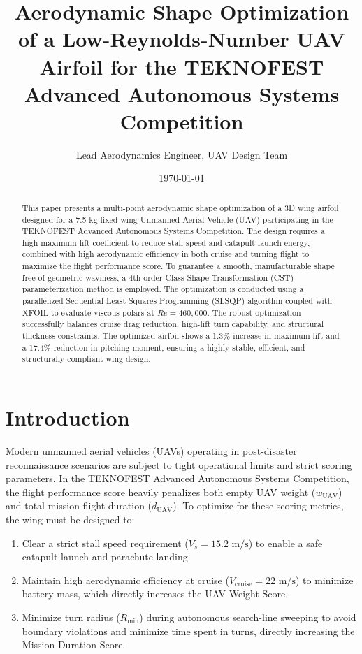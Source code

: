 \documentclass[11pt]{article}
\begin{document}
\title{\textbf{Aerodynamic Shape Optimization of a Low-Reynolds-Number UAV Airfoil for the TEKNOFEST Advanced Autonomous Systems Competition}}

\author{Lead Aerodynamics Engineer, UAV Design Team}
\date{\today}

\maketitle

\begin{abstract}
This paper presents a multi-point aerodynamic shape optimization of a 3D wing airfoil designed for a 7.5 kg fixed-wing Unmanned Aerial Vehicle (UAV) participating in the TEKNOFEST Advanced Autonomous Systems Competition. The design requires a high maximum lift coefficient to reduce stall speed and catapult launch energy, combined with high aerodynamic efficiency in both cruise and turning flight to maximize the flight performance score. To guarantee a smooth, manufacturable shape free of geometric waviness, a 4th-order Class Shape Transformation (CST) parameterization method is employed. The optimization is conducted using a parallelized Sequential Least Squares Programming (SLSQP) algorithm coupled with XFOIL to evaluate viscous polars at $Re = 460,000$. The robust optimization successfully balances cruise drag reduction, high-lift turn capability, and structural thickness constraints. The optimized airfoil shows a 1.3\% increase in maximum lift and a 17.4\% reduction in pitching moment, ensuring a highly stable, efficient, and structurally compliant wing design.
\end{abstract}

\section{Introduction}
Modern unmanned aerial vehicles (UAVs) operating in post-disaster reconnaissance scenarios are subject to tight operational limits and strict scoring parameters. In the TEKNOFEST Advanced Autonomous Systems Competition, the flight performance score heavily penalizes both empty UAV weight ($w_{\text{UAV}}$) and total mission flight duration ($d_{\text{UAV}}$). 
To optimize for these scoring metrics, the wing must be designed to:
\begin{enumerate}
    \item Clear a strict stall speed requirement ($V_s = 15.2\text{ m/s}$) to enable a safe catapult launch and parachute landing.
    \item Maintain high aerodynamic efficiency at cruise ($V_{\text{cruise}} = 22\text{ m/s}$) to minimize battery mass, which directly increases the UAV Weight Score.
    \item Minimize turn radius ($R_{\text{min}}$) during autonomous search-line sweeping to avoid boundary violations and minimize time spent in turns, directly increasing the Mission Duration Score.
\end{enumerate}
\end{document}
